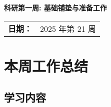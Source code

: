 \documentclass[12pt,a4paper]{article}
\begin{document}
\begin{center}
    \vspace*{1cm}
        {\Large\bfseries 科研第一周: 基础铺垫与准备工作}\\[1cm]
    
    \begin{tabular}{ll}
        \textbf{日期：} & 2025 年第 21 周\\[0.3cm]
    \end{tabular}
\end{center}


\section{本周工作总结}

\subsection{学习内容}
\end{document}
